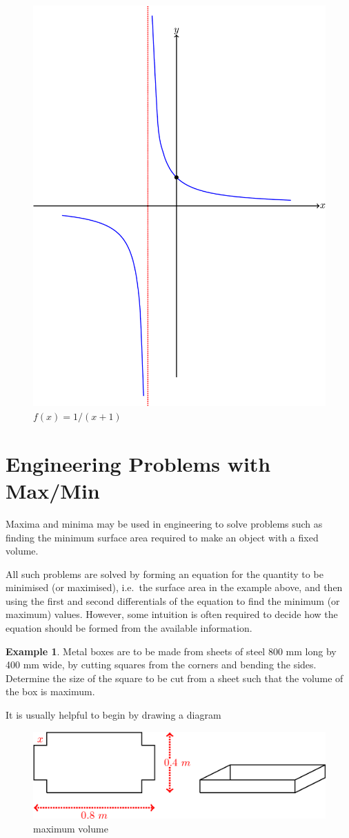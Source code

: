 \documentclass[
  11pt,
  oneside]{book}
\newcommand{\slide}{}
\theoremstyle{definition}
\theoremstyle{definition}
\newtheorem{example}{Example}[chapter]
\theoremstyle{definition}
\theoremstyle{definition}
\theoremstyle{remark}
\begin{document}
\begin{figure}

{\centering \includegraphics[width=0.3\linewidth]{tikztopng-figure18} 

}

\caption{$f(x) = 1/(x+1)$}\label{fig:unnamed-chunk-27}
\end{figure}

\slide

\section{Engineering Problems with Max/Min}\label{engineering-problems-with-maxmin}

Maxima and minima may be used in engineering to solve problems such as finding the minimum surface area required to make an object with a fixed volume.

All such problems are solved by forming an equation for the quantity to be minimised (or maximised), i.e.~the surface area in the example above, and then using the first and second differentials of the equation to find the minimum (or maximum) values. However, some intuition is often required to decide how the equation should be formed from the available information.

\begin{example}
Metal boxes are to be made from sheets of steel 800 mm long by 400 mm wide, by cutting squares from the corners and bending the sides. Determine the size of the square to be cut from a sheet such that the volume of the box is maximum.
\end{example}

It is usually helpful to begin by drawing a diagram

\begin{figure}

{\centering \includegraphics[width=0.6\linewidth]{tikztopng-figure13} 

}

\caption{maximum volume}\label{fig:unnamed-chunk-28}
\end{figure}
\end{document}
